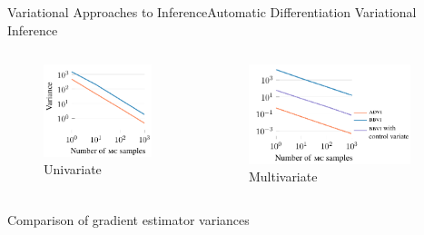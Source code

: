 \documentclass[AERbeamer%
              ,optEnglish%
              ,optBiber%
              ,optBibstyleAlphabetic%
              ,optBeamerClassicFormat%
              ]{AERlatex}%
\begin{document}
\begin{frame}[c]{Variational Approaches to Inference}{Automatic Differentiation Variational Inference}
    \centering
    \begin{columns}[T]
        \begin{column}{0.4\textwidth}
            \begin{figure}
                \centering
                \includegraphics[width=0.95\textwidth]{VIADVIUnivariate.png}
                \caption{Univariate}
            \end{figure}
        \end{column}
        \begin{column}{0.58\textwidth}
            \begin{figure}
                \centering
                \includegraphics[width=0.9\textwidth]{VIADVIMultivariate.png}
                \caption{Multivariate}
            \end{figure}
        \end{column}
    \end{columns}
    \vspace{1cm}
    Comparison of gradient estimator variances
\end{frame}
\end{document}
